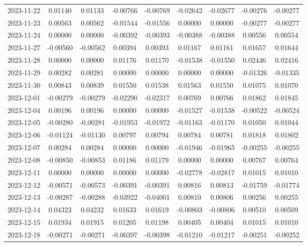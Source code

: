 {\begin{footnotesize}
\begin{longtable}{lcccccccc}
2023-11-22 & 0.01140 & 0.01133 & -0.00766 & -0.00769 & -0.02642 & -0.02677 & -0.00276 & -0.00277 \\
2023-11-23 & 0.00563 & 0.00562 & -0.01544 & -0.01556 & 0.00000 & 0.00000 & -0.00277 & -0.00277 \\
2023-11-24 & 0.00000 & 0.00000 & -0.00392 & -0.00393 & -0.00388 & -0.00388 & 0.00556 & 0.00554 \\
2023-11-27 & -0.00560 & -0.00562 & 0.00394 & 0.00393 & 0.01167 & 0.01161 & 0.01657 & 0.01644 \\
2023-11-28 & 0.00000 & 0.00000 & 0.01176 & 0.01170 & -0.01538 & -0.01550 & 0.02446 & 0.02416 \\
2023-11-29 & 0.00282 & 0.00281 & 0.00000 & 0.00000 & 0.00000 & 0.00000 & -0.01326 & -0.01335 \\
2023-11-30 & 0.00843 & 0.00839 & 0.01550 & 0.01538 & 0.01563 & 0.01550 & 0.01075 & 0.01070 \\
2023-12-01 & -0.00279 & -0.00279 & -0.02290 & -0.02317 & 0.00769 & 0.00766 & 0.01862 & 0.01845 \\
2023-12-04 & 0.00196 & 0.00196 & 0.00000 & 0.00000 & -0.01527 & -0.01538 & -0.00522 & -0.00524 \\
2023-12-05 & -0.00280 & -0.00281 & -0.01953 & -0.01972 & -0.01163 & -0.01170 & 0.01050 & 0.01044 \\
2023-12-06 & -0.01124 & -0.01130 & 0.00797 & 0.00794 & 0.00784 & 0.00781 & 0.01818 & 0.01802 \\
2023-12-07 & 0.00284 & 0.00284 & 0.00000 & 0.00000 & -0.01946 & -0.01965 & -0.00255 & -0.00255 \\
2023-12-08 & -0.00850 & -0.00853 & 0.01186 & 0.01179 & 0.00000 & 0.00000 & 0.00767 & 0.00764 \\
2023-12-11 & 0.00000 & 0.00000 & 0.00000 & 0.00000 & -0.02778 & -0.02817 & 0.01015 & 0.01010 \\
2023-12-12 & -0.00571 & -0.00573 & -0.00391 & -0.00391 & 0.00816 & 0.00813 & -0.01759 & -0.01774 \\
2023-12-13 & -0.00287 & -0.00288 & -0.03922 & -0.04001 & 0.00810 & 0.00806 & 0.00256 & 0.00255 \\
2023-12-14 & 0.04323 & 0.04232 & 0.01633 & 0.01619 & -0.00803 & -0.00806 & 0.00510 & 0.00509 \\
2023-12-15 & 0.01934 & 0.01915 & 0.01205 & 0.01198 & 0.00405 & 0.00404 & 0.01015 & 0.01010 \\
2023-12-18 & -0.00271 & -0.00271 & -0.00397 & -0.00398 & -0.01210 & -0.01217 & -0.00251 & -0.00252 \\

\end{longtable}
\end{footnotesize}}
